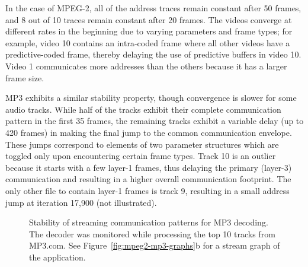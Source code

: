 In the case of MPEG-2, all of the address traces remain constant after
50 frames, and 8 out of 10 traces remain constant after 20 frames.
The videos converge at different rates in the beginning due to varying
parameters and frame types; for example, video 10 contains an
intra-coded frame where all other videos have a predictive-coded
frame, thereby delaying the use of predictive buffers in video 10.
Video 1 communicates more addresses than the others because it has a
larger frame size.

MP3 exhibits a similar stability property, though convergence is
slower for some audio tracks.  While half of the tracks exhibit their
complete communication pattern in the first 35 frames, the remaining
tracks exhibit a variable delay (up to 420 frames) in making the final
jump to the common communication envelope.  These jumps correspond to
elements of two parameter structures
which are toggled only upon encountering certain frame types.  Track
10 is an outlier because it starts with a few layer-1 frames, thus
delaying the primary (layer-3) communication and resulting in a higher
overall communication footprint.  The only other file to contain
layer-1 frames is track 9, resulting in a small address jump at
iteration 17,900 (not illustrated).

\begin{figure}[t]
\begin{minipage}{3.075in}
\hspace{-0.05in}
\vspace{-12pt}
\caption[Stability of streaming communication patterns for MPEG-2
  decoding.]{Stability of streaming communication patterns for MPEG-2
  decoding.  The decoder was monitored while processing the top 10
  short videos
from YouTube.  See Figure~\ref{fig:mpeg2-mp3-graphs}a for a stream
graph of the application.\protect\label{fig:mpeg2-addresses}}
\end{minipage}
\hspace{0.3in}
\begin{minipage}{3.02in}
\hspace{-0.05in}
\vspace{-12pt}
\caption[Stability of streaming communication patterns for MP3
  decoding.]{Stability of streaming communication patterns for MP3
  decoding.  The decoder was monitored while processing the top 10
  tracks from MP3.com.  See Figure~\ref{fig:mpeg2-mp3-graphs}b for a
  stream graph of the application.  \protect\label{fig:mp3-addresses}}
\end{minipage}
\end{figure}


